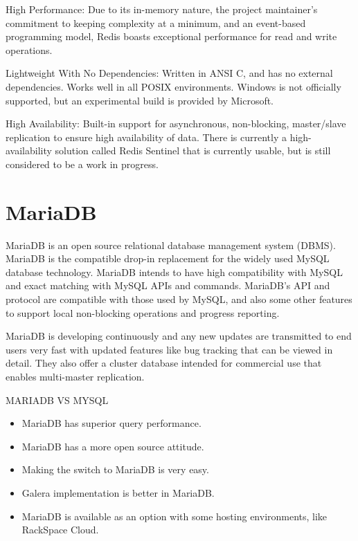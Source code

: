 High Performance:  Due to its in-memory nature, the project maintainer’s commitment to keeping complexity at a minimum, and an event-based programming model, Redis boasts exceptional performance for read and write operations.\newline

Lightweight With No Dependencies:  Written in ANSI C, and has no external dependencies. Works well in all POSIX environments. Windows is not officially supported, but an experimental build is provided by Microsoft.\newline

High Availability:  Built-in support for asynchronous, non-blocking, master/slave replication to ensure high availability of data. There is currently a high-availability solution called Redis Sentinel that is currently usable, but is still considered to be a work in progress.\newline

\section {MariaDB}
MariaDB is an open source relational database management system (DBMS). MariaDB is the compatible drop-in replacement for the widely used MySQL database technology. MariaDB intends to have high compatibility with MySQL and exact matching with MySQL APIs and commands. MariaDB's API and protocol are compatible with those used by MySQL, and also some other features to support local non-blocking operations and progress reporting.\newline

MariaDB is developing continuously and any new updates are transmitted to end users very fast with updated features like bug tracking that can be viewed in detail. They also offer a cluster database intended for commercial use that enables multi-master replication.\newline

MARIADB VS MYSQL\newline
\begin{itemize}
\item MariaDB has superior query performance.
\item MariaDB has a more open source attitude.
\item Making the switch to MariaDB is very easy.
\item Galera implementation is better in MariaDB.
\item MariaDB is available as an option with some hosting environments, like RackSpace Cloud.
\end{itemize}
\newline
